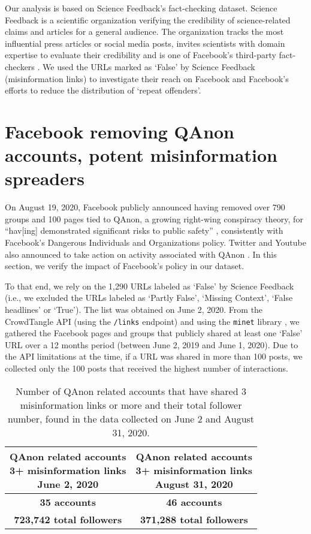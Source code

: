 \documentclass[sigconf]{acmart}
\begin{document}
Our analysis is based on Science Feedback's fact-checking dataset. Science Feedback is a scientific organization verifying the credibility of science-related claims and articles for a general audience. The organization tracks the most influential press articles or social media posts, invites scientists with domain expertise to evaluate their credibility and is one of  Facebook's third-party fact-checkers \cite{ScienceFeedbackCommunication}. We used the URLs marked as `False' by Science Feedback (misinformation links) to investigate their reach on Facebook and Facebook's efforts to reduce the distribution of `repeat offenders'.

\section{Facebook removing QAnon accounts, potent misinformation spreaders}

On August 19, 2020, Facebook publicly announced having removed over 790 groups and 100 pages tied to QAnon, a growing right-wing conspiracy theory, for ``hav[ing] demonstrated significant risks to public safety'' \cite{FacebookQAnon}, consistently with Facebook's Dangerous Individuals and Organizations policy. Twitter and Youtube also announced to take action on activity associated with QAnon \cite{TwitterQAnon, YoutubeQAnon}. In this section, we verify the impact of Facebook's policy in our dataset.

To that end, we rely on the 1,290 URLs labeled as `False' by Science Feedback (i.e., we excluded the URLs labeled as `Partly False', `Missing Context', `False headlines' or `True'). The list was obtained on June 2, 2020. From the CrowdTangle API (using the \verb|/links| endpoint) and using the \verb|minet| library \cite{minet}, we gathered the Facebook pages and groups that publicly shared at least one `False' URL over a 12 months period (between June 2, 2019 and June 1, 2020). Due to the API limitations at the time, if a URL was shared in more than 100 posts, we collected only the 100 posts that received the highest number of interactions.

\begin{table}[h]
  \caption{Number of QAnon related accounts that have shared 3 misinformation links or more and their total follower number, found in the data collected on June 2 and August 31, 2020.}
  \label{table_2}
  \begin{tabular}{cc}
    \toprule
    \shortstack{QAnon related accounts\\ 3+ misinformation links \\ June 2, 2020} & \shortstack{QAnon related accounts\\ 3+ misinformation links \\ August 31, 2020} \\
    \midrule
    \textbf{35 accounts} & \textbf{46 accounts}\\
    \textbf{723,742 total followers} & \textbf{371,288 total followers}\\
  \bottomrule
\end{tabular}
\end{table}
\end{document}
